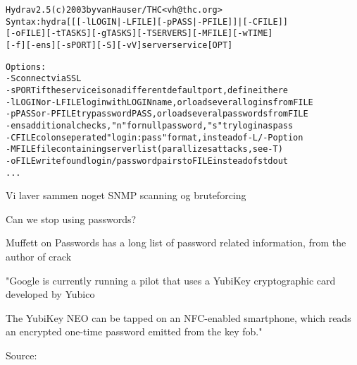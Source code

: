 \documentclass[20pt,landscape,a4paper,footrule]{foils}
\begin{document}
\begin{alltt}
\small
Hydra v2.5 (c) 2003 by van Hauser / THC <vh@thc.org>
Syntax: hydra [[[-l LOGIN|-L FILE] [-p PASS|-P FILE]] | [-C FILE]]
[-o FILE] [-t TASKS] [-g TASKS] [-T SERVERS] [-M FILE] [-w TIME]
[-f] [-e ns] [-s PORT] [-S] [-vV] server service [OPT]

Options:
  -S        connect via SSL
  -s PORT   if the service is on a different default port, define it here
  -l LOGIN  or -L FILE login with LOGIN name, or load several logins from FILE
  -p PASS   or -P FILE try password PASS, or load several passwords from FILE
  -e ns     additional checks, "n" for null password, "s" try login as pass
  -C FILE   colon seperated "login:pass" format, instead of -L/-P option
  -M FILE   file containing server list (parallizes attacks, see -T)
  -o FILE   write found login/password pairs to FILE instead of stdout
...
\end{alltt}


Vi laver sammen noget SNMP scanning og bruteforcing



Can we stop using passwords?

Muffett on Passwords has a long list of password related information, from the author of crack 






"Google is currently running a pilot that uses a YubiKey cryptographic card developed by Yubico

The YubiKey NEO can be tapped on an NFC-enabled smartphone, which reads an encrypted one-time password emitted from the key fob."

Source:\\
{\footnotesize {}
}


\end{document}

